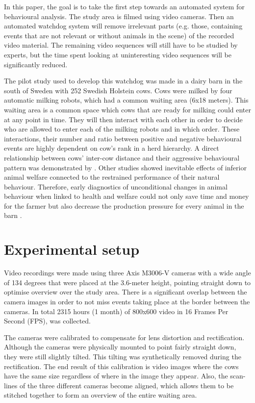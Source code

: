 \documentclass[10pt,a4paper,twocolumn]{article}
\begin{document}
In this paper, the goal is to take the first step towards an automated system for behavioural analysis. The study area is filmed using video cameras. Then an automated watchdog system will remove irrelevant parts (e.g. those, containing events that are not relevant or without animals in the scene) of the recorded video material. The remaining video sequences will still have to be studied by experts, but the time spent looking at uninteresting video sequences will be significantly reduced.

The pilot study used to develop this watchdog was made in a dairy barn in the south of Sweden with 252 Swedish Holstein cows. Cows were milked by four automatic milking robots, which had a common waiting area (6x18 meters). This waiting area is a common space which cows that are ready for milking could enter at any point in time. They will then interact with each other  in order to decide who are allowed to enter each of the milking robots and in which order. These interactions, their number and ratio between positive and negative behavioural events are highly dependent on cow's rank in a herd hierarchy. A direct relationship between cows' inter-cow distance and their aggressive behavioural pattern was demonstrated by \cite{DeVriesetal2004}. Other studies \cite{Hemsworth2003, Kilgour2012} showed inevitable effects of inferior animal welfare connected to the restrained performance of their natural behaviour. Therefore, early diagnostics of unconditional changes in animal behaviour when linked to health and welfare could not only save time and money for the farmer but also decrease the production pressure for every animal in the barn \cite{Polikarpusetal2015}.


\section{Experimental setup}

Video recordings were made using three Axis M3006-V cameras with a wide angle of 134 degrees that were placed at the 3.6-meter height, pointing straight down to optimise overview over the study area. There is a significant overlap between the camera images in order to not miss events taking place at the border between the cameras. In total 2315 hours (1 month) of 800x600 video in 16 Frames Per Second (FPS), was collected.

The cameras were calibrated to compensate for lens distortion and rectification. Although the cameras were physically mounted to point fairly straight down, they were still slightly tilted. This tilting was synthetically removed during the rectification. The end result of this calibration is video images where the cows have the same size regardless of where in the image they appear. Also, the scan-lines of the three different cameras become aligned, which allows them to be stitched together to form an overview of the entire waiting area.
\end{document}
